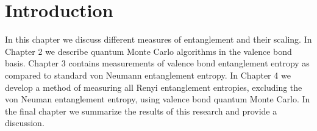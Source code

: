 \chapter{Introduction}



In this chapter we discuss different measures of entanglement and their scaling.
In Chapter 2 we describe quantum Monte Carlo algorithms in the valence bond basis.
Chapter 3 contains measurements of valence bond entanglement entropy as compared to standard von Neumann entanglement entropy.
In Chapter 4 we develop a method of measuring all Renyi entanglement entropies, excluding the von Neuman entanglement entropy, using valence bond quantum Monte Carlo.
In the final chapter we summarize the results of this research and provide a discussion.

